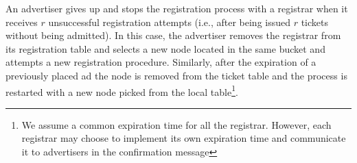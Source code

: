 An advertiser gives up and stops the registration process with a registrar when
it receives $r$ unsuccessful registration attempts (i.e., after being issued $r$
tickets without being admitted). In this case, the advertiser removes the registrar from its registration table and selects a new node located in the same bucket and attempts a new registration procedure.
Similarly,  after the expiration of a previously placed ad the node is removed from the ticket table and the process is restarted with a new node picked from the local table\footnote{We assume a common expiration time for all the registrar. However, each registrar may choose to implement its own expiration time and communicate it to advertisers in the confirmation message}.
